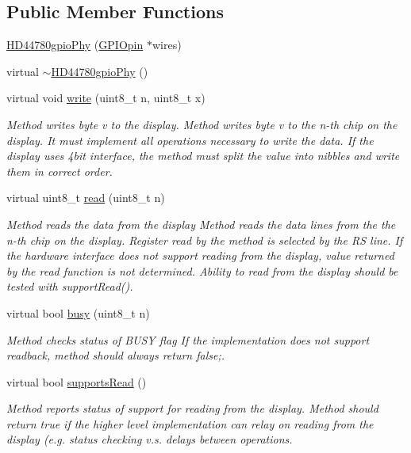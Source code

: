 \subsection*{Public Member Functions}
\begin{DoxyCompactItemize}
\item 
\hyperlink{class_h_d44780gpio_phy_a47de0045a7ef81a41c9887ad47c3122f}{H\-D44780gpio\-Phy} (\hyperlink{class_g_p_i_opin}{G\-P\-I\-Opin} $\ast$wires)
\item 
virtual \hyperlink{class_h_d44780gpio_phy_a646fd32d14debc4d369312495c6e77e8}{$\sim$\-H\-D44780gpio\-Phy} ()
\item 
virtual void \hyperlink{class_h_d44780gpio_phy_a1c8e591c8c4c8287f70a7ba398ebb744}{write} (uint8\-\_\-t n, uint8\-\_\-t x)
\begin{DoxyCompactList}\small\item\em Method writes byte v to the display. Method writes byte v to the n-\/th chip on the display. It must implement all operations necessary to write the data. If the display uses 4bit interface, the method must split the value into nibbles and write them in correct order. \end{DoxyCompactList}\item 
virtual uint8\-\_\-t \hyperlink{class_h_d44780gpio_phy_a0a30a28c612d067c3023c4fb5f1388a0}{read} (uint8\-\_\-t n)
\begin{DoxyCompactList}\small\item\em Method reads the data from the display Method reads the data lines from the the n-\/th chip on the display. Register read by the method is selected by the R\-S line. If the hardware interface does not support reading from the display, value returned by the read function is not determined. Ability to read from the display should be tested with {\itshape support\-Read()}. \end{DoxyCompactList}\item 
virtual bool \hyperlink{class_h_d44780gpio_phy_aca1ef4ea05900362e4feb63f062d0b3e}{busy} (uint8\-\_\-t n)
\begin{DoxyCompactList}\small\item\em Method checks status of B\-U\-S\-Y flag If the implementation does not support readback, method should always return false;. \end{DoxyCompactList}\item 
virtual bool \hyperlink{class_h_d44780gpio_phy_a9c2ca3dca1582a529ef154e492ed214a}{supports\-Read} ()
\begin{DoxyCompactList}\small\item\em Method reports status of support for reading from the display. Method should return true if the higher level implementation can relay on reading from the display (e.\-g. status checking v.\-s. delays between operations. \end{DoxyCompactList}\item 

\end{DoxyCompactItemize}
